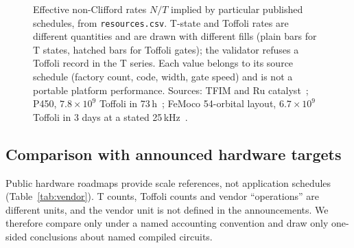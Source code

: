 \documentclass[10pt,a4paper]{article}
\begin{document}
\begin{figure}[htbp]
\centering
{}
\caption[Rates implied by particular schedules]{Effective non-Clifford rates $N/T$ implied by particular published schedules, from \texttt{resources.csv}. T-state and Toffoli rates are different quantities and are drawn with different fills (plain bars for T states, hatched bars for Toffoli gates); the validator refuses a Toffoli record in the T series. Each value belongs to its source schedule (factory count, code, width, gate speed) and is not a portable platform performance. Sources: TFIM and Ru catalyst~\cite{beverland2022}; P450, $7.8\times10^9$ Toffoli in 73\,h~\cite{goings2022}; FeMoco 54-orbital layout, $6.7\times10^9$ Toffoli in 3 days at a stated 25\,kHz~\cite{lee2021thc}.}
\label{fig:rates}
\end{figure}

\subsection{Comparison with announced hardware targets}
\label{app:vendor}
Public hardware roadmaps provide scale references, not application schedules (Table~\ref{tab:vendor}). T counts, Toffoli counts and vendor ``operations'' are different units, and the vendor unit is not defined in the announcements. We therefore compare only under a named accounting convention and draw only one-sided conclusions about named compiled circuits.
\end{document}
